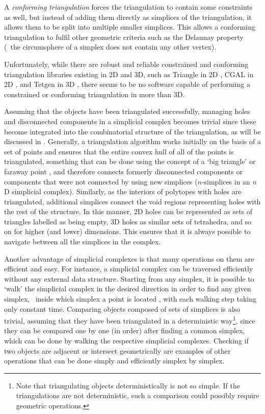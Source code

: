A \emph{conforming triangulation} forces the triangulation to contain some constraints as well, but instead of adding them directly as simplices of the triangulation, it allows them to be split into multiple smaller simplices.
This allows a conforming triangulation to fulfil other geometric criteria such as the Delaunay property (\ie\ the circumsphere of a simplex does not contain any other vertex).

Unfortunately, while there are robust and reliable constrained and conforming triangulation libraries existing in 2D and 3D, such as Triangle in 2D \citep{Shewchuk96}, CGAL in 2D \citep{Boissonnat02}, and Tetgen in 3D \citep{Si05}, there seems to be no software capable of performing a constrained or conforming triangulation in more than 3D.

Assuming that the objects have been triangulated successfully, managing holes and disconnected components in a simplicial complex becomes trivial since these become integrated into the combinatorial structure of the triangulation, as will be discussed in .
Generally, a triangulation algorithm works initially on the basis of a set of points and ensures that the entire convex hull of all of the points is triangulated, something that can be done using the concept of a `big triangle' or faraway point \citep{Liu08}, and therefore connects formerly disconnected components or components that were not connected by using new simplices ($n$-simplices in an $n$D simplicial complex).
Similarly, as the interiors of polytopes with holes are triangulated, additional simplices connect the void regions representing holes with the rest of the structure.
In this manner, 2D holes can be represented as sets of triangles labelled as being empty, 3D holes as similar sets of tetrahedra, and so on for higher (and lower) dimensions.
This ensures that it is always possible to navigate between all the simplices in the complex.

Another advantage of simplicial complexes is that many operations on them are efficient and easy.
For instance, a simplicial complex can be traversed efficiently without any external data structure.
Starting from any simplex, it is possible to `walk' the simplicial complex in the desired direction in order to find any given simplex, \eg\ inside which simplex a point is located \citep{Devillers02a}, with each walking step taking only constant time.
Comparing objects composed of sets of simplices is also trivial, assuming that they have been triangulated in a deterministic way\footnote{Note that triangulating objects deterministically is not so simple.
If the triangulations are not deterministic, such a comparison could possibly require geometric operations.}, since they can be compared one by one (in order) after finding a common simplex, which can be done by walking the respective simplicial complexes.
Checking if two objects are adjacent or intersect geometrically are examples of other operations that can be done simply and efficiently simplex by simplex.

